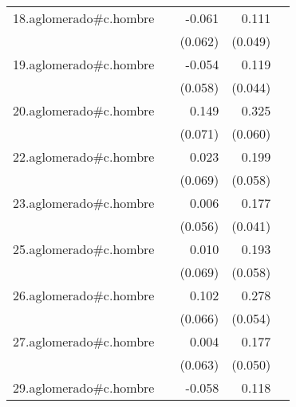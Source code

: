 {\begin{longtable}{l*{4}{D{.}{.}{-1}}}
\addlinespace
18.aglomerado#c.hombre&                     &      -0.061         &       0.111\sym{*}  &                     \\
            &                     &     (0.062)         &     (0.049)         &                     \\
\addlinespace
19.aglomerado#c.hombre&                     &      -0.054         &       0.119\sym{**} &                     \\
            &                     &     (0.058)         &     (0.044)         &                     \\
\addlinespace
20.aglomerado#c.hombre&                     &       0.149\sym{*}  &       0.325\sym{***}&                     \\
            &                     &     (0.071)         &     (0.060)         &                     \\
\addlinespace
22.aglomerado#c.hombre&                     &       0.023         &       0.199\sym{***}&                     \\
            &                     &     (0.069)         &     (0.058)         &                     \\
\addlinespace
23.aglomerado#c.hombre&                     &       0.006         &       0.177\sym{***}&                     \\
            &                     &     (0.056)         &     (0.041)         &                     \\
\addlinespace
25.aglomerado#c.hombre&                     &       0.010         &       0.193\sym{***}&                     \\
            &                     &     (0.069)         &     (0.058)         &                     \\
\addlinespace
26.aglomerado#c.hombre&                     &       0.102         &       0.278\sym{***}&                     \\
            &                     &     (0.066)         &     (0.054)         &                     \\
\addlinespace
27.aglomerado#c.hombre&                     &       0.004         &       0.177\sym{***}&                     \\
            &                     &     (0.063)         &     (0.050)         &                     \\
\addlinespace
29.aglomerado#c.hombre&                     &      -0.058         &       0.118\sym{***}&                     \\

\end{longtable}}
